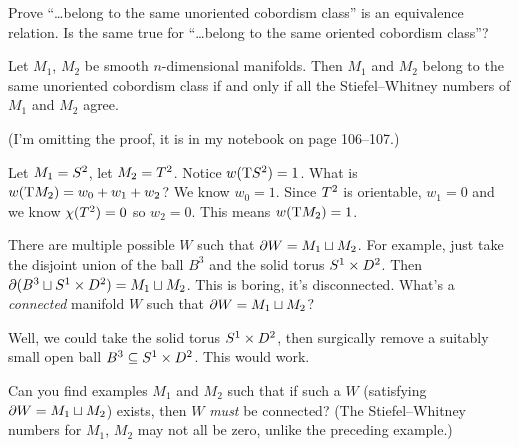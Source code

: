 \begin{xca}
Prove ``\dots belong to the same unoriented cobordism class'' is an
equivalence relation. Is the same true for ``\dots belong to the same
oriented cobordism class''?
\end{xca}

\begin{corollary}
Let $M_{1}$, $M_{2}$ be smooth $n$-dimensional manifolds.
Then $M_{1}$ and $M_{2}$ belong to the same unoriented cobordism
class if and only if all the Stiefel--Whitney numbers of $M_{1}$ and
$M_{2}$ agree.
\end{corollary}
(I'm omitting the proof, it is in my notebook on page 106--107.)

\begin{example}
Let $M_{1}=S^{2}$, let $M_{2}=T^{2}$. Notice
$w(\mathrm{T}S^{2})=1$. What is $w(\mathrm{T} M_{2})=w_{0}+w_{1}+w_{2}$? We know
$w_{0}=1$. Since $T^{2}$ is orientable, $w_{1}=0$ and we know
$\chi(T^{2})=0$ so $w_{2}=0$. This means $w(\mathrm{T} M_{2})=1$.

There are multiple possible $W$ such that $\partial W=M_{1}\sqcup M_{2}$.
For example, just take the disjoint union of the ball $B^{3}$ and the
solid torus $S^{1}\times D^{2}$. Then $\partial(B^{3}\sqcup S^{1}\times D^{2})=M_{1}\sqcup M_{2}$.
This is boring, it's disconnected. What's a \emph{connected} manifold
$W$ such that $\partial W=M_{1}\sqcup M_{2}$?

Well, we could take the solid torus $S^{1}\times D^{2}$, then
surgically remove a suitably small open ball $B^{3}\subseteq S^{1}\times D^{2}$.
This would work.
\end{example}

\begin{question}
Can you find examples $M_{1}$ and $M_{2}$ such that if such a $W$
(satisfying $\partial W=M_{1}\sqcup M_{2}$) exists, then $W$
\emph{must} be connected? (The Stiefel--Whitney numbers for $M_{1}$,
$M_{2}$ may not all be zero, unlike the preceding example.)
\end{question}